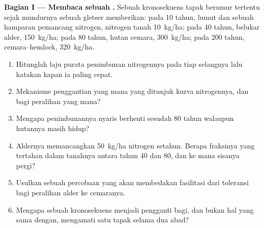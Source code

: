 \begin{problem}
\label{pb:b1:ecosystem-dynamics:1}

\medskip
\noindent\textbf{Bagian I --- Membaca sebuah .}
Sebuah kronosekuens tapak berumur tertentu sejak mundurnya sebuah
gletser memberikan: pada 10 tahun, lumut dan sebuah hamparan pemancang
nitrogen, nitrogen tanah \qty{10}{kg/ha}; pada 40 tahun, belukar alder,
\qty{150}{kg/ha}; pada 80 tahun, hutan cemara, \qty{300}{kg/ha}; pada
200 tahun, cemara--hemlock, \qty{320}{kg/ha}.
\begin{enumerate}
  \item Hitunglah laju purata penimbunan nitrogennya pada tiap
        selangnya lalu katakan kapan ia paling cepat.
  \item Mekanisme penggantian yang mana yang ditunjuk kurva
        nitrogennya, dan bagi peralihan yang mana?
  \item Mengapa penimbunannya nyaris berhenti sesudah 80 tahun
        walaupun hutannya masih hidup?
  \item Aldernya memancangkan \qty{50}{kg/ha} nitrogen setahun. Berapa
        fraksinya yang tertahan dalam tanahnya antara tahun 40 dan 80,
        dan ke mana sisanya pergi?
  \item Usulkan sebuah percobaan yang akan membedakan fasilitasi dari
        toleransi bagi peralihan alder ke cemaranya.
  \item Mengapa sebuah kronosekuens menjadi pengganti bagi, dan bukan
        hal yang sama dengan, mengamati satu tapak selama dua abad?
\end{enumerate}


\end{problem}

